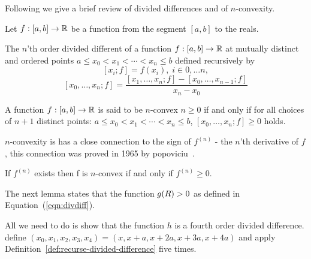 \documentclass{article}[12pt]
\begin{document}
Following\cite{butt2016generalization} we give a brief review of
divided differences and of $n$-convexity.

Let $f:[a,b] \to \mathbb{R}$ be a function from the segment $[a,b]$ to the
reals.

\begin{definition} \label{def:recurse-divided-difference}
  The $n$'th order divided different of a function $f:[a,b] \to
  \mathbb{R}$ at mutually distinct and ordered points $a \leq x_0 < x_1
  < \cdots < x_n \leq b$
  defined recursively by
  \[ [x_i; f] = f(x_i), \; i \in 0,\ldots n,\]
  \[ [x_0,\ldots,x_n;f] =
    \frac{[x_1,\ldots,x_n;f]-[x_0,\ldots,x_{n-1};f]}{x_n-x_0} \]
\end{definition}

\begin{definition}[$n$-convexity]
 A function $f:[a,b] \to \mathbb{R}$ is said to be $n$-convex  $n \geq 0$
 if and only if for all choices of $n+1$ distinct points: $a \leq x_0 < x_1
  < \cdots < x_n \leq b$, $[x_0,\ldots,x_n;f]\geq 0$ holds.
\end{definition}
$n$-convexity is has a close connection to the sign of $f^{(n)}$ - the $n$'th
derivative of $f$, this connection was proved in 1965 by
popoviciu~\cite{popoviciu1965certaines}.
\begin{theorem} \label{thm:popo}
If $f^{(n)}$ exists then f is $n$-convex if and only if $f^{(n)}\geq 0$.
\end{theorem}

The next lemma states that the function $g(R)>0$ as defined in
Equation~(\ref{eqn:divdiff}).


All we need to do is show that the function $h$ is a fourth order divided difference.
define $(x_0,x_1,x_2,x_3,x_4) = (x,x+a,x+2a,x+3a,x+4a)$ and apply Definition~\ref{def:recurse-divided-difference} five times.
\end{document}
